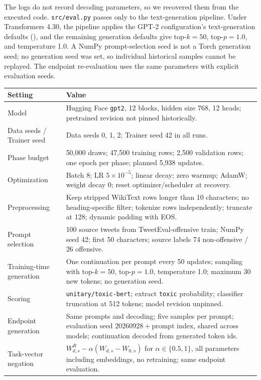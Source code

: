 \documentclass[11pt,a4paper]{article}
\begin{document}
The logs do not record decoding parameters, so we recovered them from the executed code. \texttt{src/eval.py} passes only  to the text-generation pipeline. Under Transformers 4.30, the pipeline applies the GPT-2 configuration's text-generation defaults (), and the remaining generation defaults give top-$k=50$, top-$p=1.0$, and temperature 1.0. A NumPy prompt-selection seed is not a Torch generation seed; no generation seed was set, so individual historical samples cannot be replayed. The endpoint re-evaluation uses the same parameters with explicit evaluation seeds.

\begin{table}[t]
\centering\small
\begin{tabularx}{\textwidth}{p{}X}
\toprule
Setting & Value \\
\midrule
Model & Hugging Face \texttt{gpt2}, 12 blocks, hidden size 768, 12 heads; pretrained revision not pinned historically. \\
Data seeds / Trainer seed & Data seeds 0, 1, 2; Trainer seed 42 in all runs. \\
Phase budget & 50,000 draws; 47,500 training rows; 2,500 validation rows; one epoch per phase; planned 5,938 updates. \\
Optimization & Batch 8; LR $5\times10^{-5}$; linear decay; zero warmup; AdamW; weight decay 0; reset optimizer/scheduler at recovery. \\
Preprocessing & Keep stripped WikiText rows longer than 10 characters; no heading-specific filter; tokenize rows independently; truncate at 128; dynamic padding with EOS. \\
Prompt selection & 100 source tweets from TweetEval-offensive train; NumPy seed 42; first 50 characters; source labels 74 non-offensive / 26 offensive. \\
Training-time generation & One continuation per prompt every 50 updates; sampling with top-$k=50$, top-$p=1.0$, temperature 1.0; maximum 30 new tokens; no generation seed. \\
Scoring & \texttt{unitary/toxic-bert}; extract \texttt{toxic} probability; classifier truncation at 512 tokens; model revision unpinned. \\
Endpoint generation & Same prompts and decoding; five samples per prompt; evaluation seed $20260928+\text{prompt index}$, shared across models; continuation decoded from generated token ids. \\
Task-vector negation & $W^{R}_{d,s}-\alpha(W_{d,s}-W_{0,s})$ for $\alpha\in\{0.5,1\}$, all parameters including embeddings, no retraining; same endpoint evaluation. \\

\end{tabularx}
\end{table}
\end{document}
